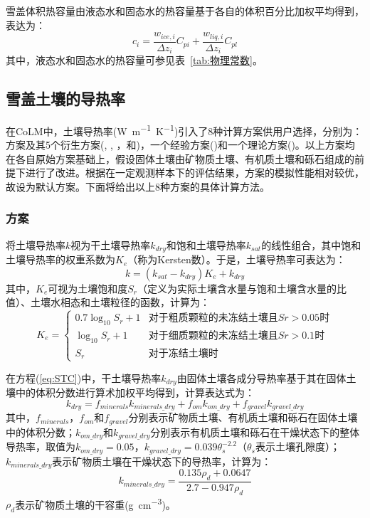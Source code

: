 雪盖体积热容量由液态水和固态水的热容量基于各自的体积百分比加权平均得到，表达为：
\begin{equation}
c_{i}=\frac{w_{ice, i}}{\Delta z_{i}} C_{pi}+\frac{w_{liq, i}}{\Delta z_{i}} C_{pl}
\end{equation}
其中，液态水和固态水的热容量可参见表~\ref{tab:物理常数}。

\subsection{雪盖土壤的导热率}

在CoLM中，土壤导热率(\unit{W.m^{-1}.K^{-1}})引入了8种计算方案供用户选择，分别为：\citet{Johansen1975}方案及其5个衍生方案(\citet{farouki1981thermal}, \citet{cote2005}, \citet{balland2005}，\citet{lu2007improved}和\citet{Yan2019thermal})，一个经验方案(\citet{tarnawski2012series})和一个理论方案(\citet{de1963thermal})。以上方案均在各自原始方案基础上，假设固体土壤由矿物质土壤、有机质土壤和砾石组成的前提下进行了改进。根据\citep{dai2019evaluation}在一定观测样本下的评估结果，\citet{balland2005}方案的模拟性能相对较优，故设为默认方案。下面将给出以上8种方案的具体计算方法。

\subsubsection{\citet{Johansen1975}方案}
\citet{Johansen1975}将土壤导热率$k$视为干土壤导热率$k_{dry}$和饱和土壤导热率$k_{sat}$的线性组合，其中饱和土壤导热率的权重系数为$K_e$（称为Kersten数）。于是，土壤导热率可表达为：
\begin{equation}\label{eq:STC}
k=(k_{sat}-k_{dry})K_e+k_{dry}
\end{equation}
其中，$K_e$可视为土壤饱和度$S_r$（定义为实际土壤含水量与饱和土壤含水量的比值）、土壤水相态和土壤粒径的函数，计算为：
\begin{equation}
K_e=\begin{cases}
0.7\log_{10}S_r+1 & \text {对于粗质颗粒的未冻结土壤且} Sr>0.05 \text {时} \\ 
\log_{10}S_r+1 & \text {对于细质颗粒的未冻结土壤且}Sr>0.1 \text {时} \\ 
S_r & \text {对于冻结土壤时}
\end{cases}
\end{equation}

在方程(\ref{eq:STC})中，干土壤导热率$k_{dry}$由固体土壤各成分导热率基于其在固体土壤中的体积分数进行算术加权平均得到，计算表达式为：
\begin{equation}\label{eq:STC_dry}
k_{dry}=f_{minerals}k_{minerals\_dry}+f_{om}k_{om\_dry}+f_{gravel}k_{gravel\_dry}
\end{equation}
其中，$f_{minerals}$，$f_{om}$和$f_{gravel}$分别表示矿物质土壤、有机质土壤和砾石在固体土壤中的体积分数；$k_{om\_dry}$和$k_{gravel\_dry}$分别表示有机质土壤和砾石在干燥状态下的整体导热率，取值为$k_{om\_dry}=0.05$，$k_{gravel\_dry}=0.039\theta_s^{-2.2}$（$\theta_s$表示土壤孔隙度）；$k_{minerals\_dry}$表示矿物质土壤在干燥状态下的导热率，计算为：$$k_{minerals\_dry}=\frac{0.135\rho_d+0.0647}{2.7-0.947\rho_d}$$
$\rho_d$表示矿物质土壤的干容重(\unit{g.cm^{-3}})。

